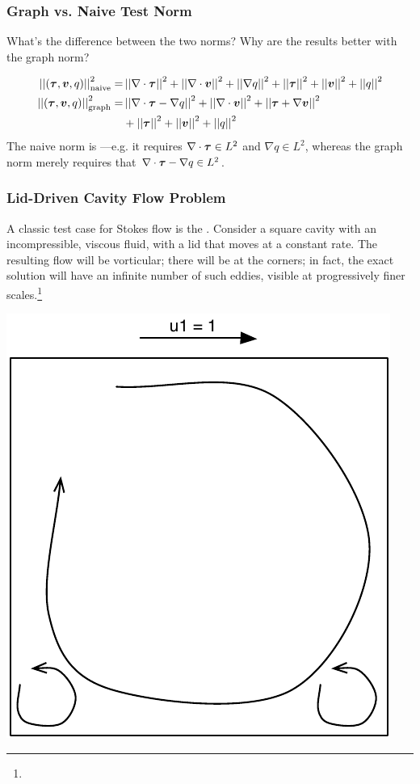 \documentclass[mathserif]{beamer}
\newcommand{\NVRvect}[1]{\ensuremath\boldsymbol{#1}}
\newcommand{\vect}[1]{\ensuremath\boldsymbol{#1}}
\newcommand{\NVRtensor}[1]{\NVRvect{#1}}
\newcommand{\norm}[1]{\left|\left|#1\right|\right|}
\newcommand{\NVRgrad}{\nabla}
\newcommand{\NVRdiv}{\NVRgrad \cdot}
\newcommand{\pecosbold}[1]{{\color{pecos2}{#1}}}
\newcommand{\FootSize}{\scriptsize}
\begin{document}
\begin{frame}
\frametitle{Graph vs. Naive Test Norm}
What's the difference between the two norms?  Why are the results better with the graph norm?

\begin{align*}
\norm{(\NVRtensor{\tau},\vect{v}, q)}_{\rm naive}^{2} =& \norm{\NVRdiv \NVRtensor{\tau}}^{2} + \norm{\NVRdiv \vect{v}}^{2} + \norm{\NVRgrad q}^{2} + \norm{\NVRtensor{\tau}}^{2} + \norm{\vect{v}}^{2} + \norm{q}^{2}\\
\vspace{30mm}
\norm{(\NVRtensor{\tau},\vect{v}, q)}_{\rm graph}^{2} =& \norm{\NVRdiv \NVRtensor{\tau} - \NVRgrad q}^{2} + \norm{\NVRdiv \vect{v}}^{2} + \norm{ \NVRtensor{\tau} + \NVRgrad{\vect{v}}}^{2}\\ 
&+ \norm{\NVRtensor{\tau}}^{2} + \norm{\vect{v}}^{2} + \norm{q}^{2}
\end{align*}
\pause
The naive norm is \pecosbold{stronger}---e.g. it requires $\NVRdiv \NVRtensor{\tau} \in L^{2}$ and $\NVRgrad q \in L^{2}$, whereas the graph norm merely requires that $\NVRdiv \NVRtensor{\tau} - \NVRgrad q \in L^{2}$.  

\end{frame}

\begin{frame}
\frametitle{Lid-Driven Cavity Flow Problem}
A classic test case for Stokes flow is the \pecosbold{lid-driven cavity flow problem}.  Consider a square cavity with an incompressible, viscous fluid, with a lid that moves at a constant rate.  The resulting flow will be vorticular; there will be \pecosbold{Moffat eddies} at the corners; in fact, the exact solution will have an infinite number of such eddies, visible at progressively finer scales.\footnote{\FootSize {}}
\begin{center}
{\includegraphics[scale=0.40]{../figures/cavity_flow_cartoon.pdf}}
\end{center}
\end{frame}
\end{document}
